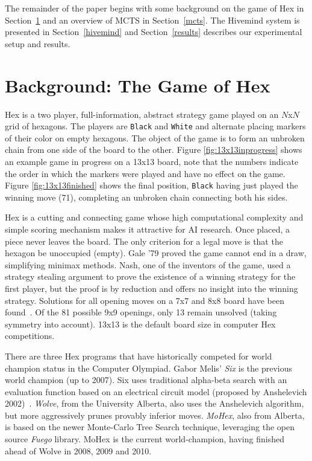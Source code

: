 \documentclass{acm_proc_article-sp}
\newcommand{\hblack}{\texttt{Black}}
\newcommand{\hwhite}{\texttt{White}}
\begin{document}
The remainder of the paper begins with some background on the game of Hex in Section~\ref{s:hex} and
an overview of MCTS in Section~\ref{mcts}.
The Hivemind system is presented in Section~\ref{hivemind}
and Section~\ref{results} describes our experimental setup and results.




\section{Background: The Game of Hex}
\label{s:hex}
Hex is a two player, full-information, abstract strategy game played on an $N$x$N$ grid of hexagons. The players are \hblack{} and \hwhite{} and alternate placing markers of their color on empty hexagons. 
The object of the game is to form an unbroken chain from one side of the board to the other. 
Figure \ref{fig:13x13inprogress} shows an example game in progress on a 13x13 board, note that the numbers indicate
the order in which the markers were played and have no effect on the game.
Figure \ref{fig:13x13finished} shows the final position, \hblack{} having just played the winning move (71), completing an unbroken chain connecting both his sides. 


Hex is a cutting and connecting game whose high computational complexity and simple scoring mechanism makes it attractive for AI research. 
Once placed, a piece never leaves the board. 
The only criterion for a legal move is that the hexagon be unoccupied (empty). 
Gale '79 proved the game cannot end in a draw, simplifying minimax methods. 
Nash, one of the inventors of the game, used a strategy stealing argument to prove the existence of a winning strategy for the first player, but the proof is by reduction and offers no insight into the winning strategy.
Solutions for all opening moves on a 7x7 and 8x8 board have been found~\cite{henderson2009solving}. 
Of the 81 possible 9x9 openings, only 13 remain unsolved (taking symmetry into account). 13x13 is the default board size in computer Hex competitions.

There are three Hex programs that have historically competed for world champion status in the Computer Olympiad. Gabor Melis' \emph{Six} is the previous world champion (up to 2007). 
Six uses traditional alpha-beta search with an evaluation function based on an electrical circuit model (proposed by Anshelevich 2002)~\cite{anshelevich2002hierarchical}. 
\emph{Wolve}, from the University Alberta, also uses the Anshelevich algorithm, but more aggressively prunes provably inferior moves. 
\emph{MoHex}, also from Alberta, is based on the newer Monte-Carlo Tree Search technique, leveraging the open source \emph{Fuego} library. 
MoHex is the current world-champion, having finished ahead of Wolve in 2008, 2009 and 2010.
\end{document}
